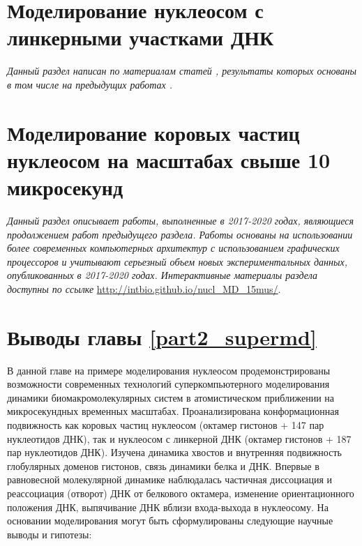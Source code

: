 


\section{Моделирование нуклеосом с линкерными участками ДНК}
\textit{Данный раздел написан по материалам статей \cite{shaytan_coupling_2016,shaytan_trajectories_2016}, результаты которых основаны в том числе на предыдущих работах \cite{armeev_conformational_2015,armeev_molecular_2015,gribkova_investigation_2017,armeev_nucleosome_2016}.}



\section{Моделирование коровых частиц нуклеосом на масштабах свыше 10 микросекунд}
\textit{Данный раздел описывает работы, выполненные в 2017-2020 годах, являющиеся продолжением работ предыдущего раздела. Работы основаны на использовании более современных компьютерных архитектур с использованием графических процессоров и учитывают серьезный объем новых экспериментальных данных, опубликованных в 2017-2020 годах. Интерактивные материалы раздела доступны по ссылке} \url{http://intbio.github.io/nucl_MD_15mus/}.




\section{Выводы главы \ref{part2_supermd}}
В данной главе на примере моделирования нуклеосом продемонстрированы возможности современных технологий суперкомпьютерного моделирования динамики биомакромолекулярных систем в атомистическом приближении на микросекундных временных масштабах. Проанализирована конформационная подвижность как коровых частиц нуклеосом (октамер гистонов + 147 пар нуклеотидов ДНК), так и нуклеосом с линкерной ДНК (октамер гистонов + 187 пар нуклеотидов ДНК). Изучена динамика хвостов и внутренняя подвижность глобулярных доменов гистонов, связь динамики белка и ДНК. Впервые в равновесной молекулярной динамике наблюдалась частичная диссоциация и реассоциация (отворот) ДНК от белкового октамера, изменение ориентационного положения ДНК, выпячивание ДНК вблизи входа-выхода в нуклеосому. На основании моделирования могут быть сформулированы следующие научные выводы и гипотезы:

